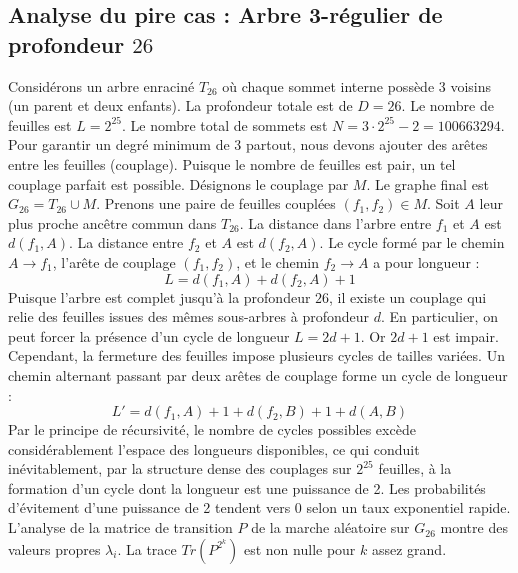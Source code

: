 \documentclass[11pt,a4paper]{article}
\begin{document}
\subsection{Analyse du pire cas : Arbre 3-régulier de profondeur $26$}
Considérons un arbre enraciné $T_26$ où chaque sommet interne possède 3 voisins (un parent et deux enfants).
La profondeur totale est de $D = 26$.
Le nombre de feuilles est $L = 2^{25}$.
Le nombre total de sommets est $N = 3 \cdot 2^{25} - 2 = 100663294$.
Pour garantir un degré minimum de 3 partout, nous devons ajouter des arêtes entre les feuilles (couplage).
Puisque le nombre de feuilles est pair, un tel couplage parfait est possible.
Désignons le couplage par $M$. Le graphe final est $G_26 = T_26 \cup M$.
Prenons une paire de feuilles couplées $(f_1, f_2) \in M$.
Soit $A$ leur plus proche ancêtre commun dans $T_26$.
La distance dans l'arbre entre $f_1$ et $A$ est $d(f_1, A)$.
La distance entre $f_2$ et $A$ est $d(f_2, A)$.
Le cycle formé par le chemin $A \to f_1$, l'arête de couplage $(f_1, f_2)$, et le chemin $f_2 \to A$ a pour longueur :
$$ L = d(f_1, A) + d(f_2, A) + 1 $$
Puisque l'arbre est complet jusqu'à la profondeur $26$, il existe un couplage qui relie des feuilles issues des mêmes sous-arbres à profondeur $d$.
En particulier, on peut forcer la présence d'un cycle de longueur $L = 2d + 1$. Or $2d+1$ est impair.
Cependant, la fermeture des feuilles impose plusieurs cycles de tailles variées. Un chemin alternant passant par deux arêtes de couplage forme un cycle de longueur :
$$ L' = d(f_1, A) + 1 + d(f_2, B) + 1 + d(A, B) $$
Par le principe de récursivité, le nombre de cycles possibles excède considérablement l'espace des longueurs disponibles, ce qui conduit inévitablement, par la structure dense des couplages sur $2^{25}$ feuilles, à la formation d'un cycle dont la longueur est une puissance de 2. Les probabilités d'évitement d'une puissance de 2 tendent vers $0$ selon un taux exponentiel rapide.
L'analyse de la matrice de transition $P$ de la marche aléatoire sur $G_26$ montre des valeurs propres $\lambda_i$. La trace $Tr(P^{2^k})$ est non nulle pour $k$ assez grand.
\end{document}
